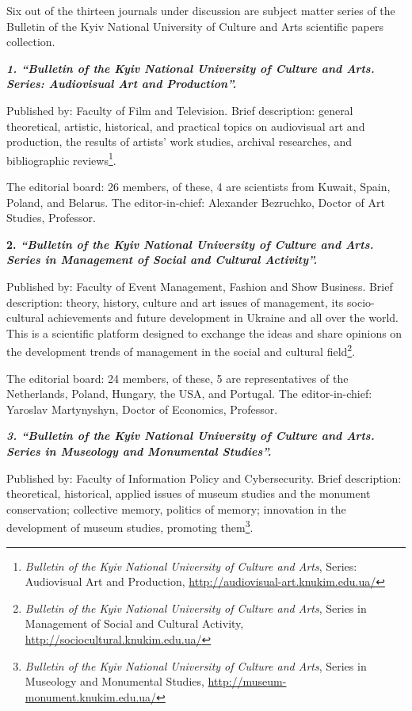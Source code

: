 \documentclass[a4paper,
fontsize=11pt,
oneside,
numbers=noperiodatend,
parskip=half-,
bibliography=totoc,
final
]{scrartcl}
\begin{document}
Six out of the thirteen journals under discussion are subject matter
series of the Bulletin of the Kyiv National University of Culture and
Arts scientific papers collection.

\textbf{\emph{1. \enquote{Bulletin of the Kyiv National University of
Culture and Arts. Series: Audiovisual Art and Production}.}}

Published by: Faculty of Film and Television. Brief description: general
theoretical, artistic, historical, and practical topics on audiovisual
art and production, the results of artists' work studies, archival
researches, and bibliographic reviews\footnote{\emph{Bulletin of the
  Kyiv National University of Culture and Arts}, Series: Audiovisual Art
  and Production, \url{http://audiovisual-art.knukim.edu.ua/}}.

The editorial board: 26 members, of these, 4 are scientists from Kuwait,
Spain, Poland, and Belarus. The editor-in-chief: Alexander Bezruchko,
Doctor of Art Studies, Professor.

\textbf{2. \emph{\enquote{Bulletin of the Kyiv National University of
Culture and Arts. Series in Management of Social and Cultural
Activity}.}}

Published by: Faculty of Event Management, Fashion and Show Business.
Brief description: theory, history, culture and art issues of
management, its socio-cultural achievements and future development in
Ukraine and all over the world. This is a scientific platform designed
to exchange the ideas and share opinions on the development trends of
management in the social and cultural field\footnote{\emph{Bulletin of
  the Kyiv National University of Culture and Arts}, Series in
  Management of Social and Cultural Activity,
  \url{http://sociocultural.knukim.edu.ua/}}.

The editorial board: 24 members, of these, 5 are representatives of the
Netherlands, Poland, Hungary, the USA, and Portugal. The
editor-in-chief: Yaroslav Martynyshyn, Doctor of Economics, Professor.

\textbf{\emph{3. \enquote{Bulletin of the Kyiv National University of
Culture and Arts. Series in Museology and Monumental Studies}.}}

Published by: Faculty of Information Policy and Cybersecurity. Brief
description: theoretical, historical, applied issues of museum studies
and the monument conservation; collective memory, politics of memory;
innovation in the development of museum studies, promoting
them\footnote{\emph{Bulletin of the Kyiv National University of Culture
  and Arts}, Series in Museology and Monumental Studies,
  \url{http://museum-monument.knukim.edu.ua/}}.
\end{document}
